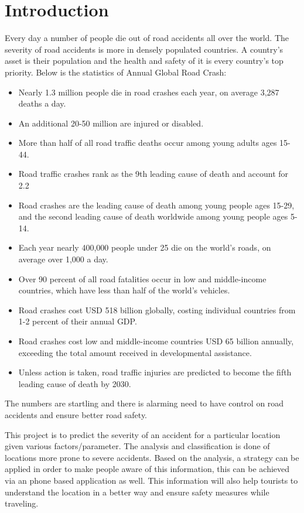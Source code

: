 \documentclass{acm_proc_article-sp}
\begin{document}
\section{Introduction}
Every day a number of people die out of road accidents all over the world. The severity of road accidents is more in densely populated countries. A country's asset is their population and the health and safety of it is every country's top priority. Below is the statistics of Annual Global Road Crash: \cite{statistics}
\begin{itemize}
    \item Nearly 1.3 million people die in road crashes each year, on average 3,287 deaths a day.
    \item An additional 20-50 million are injured or disabled.
    \item More than half of all road traffic deaths occur among young adults ages 15-44.
    \item Road traffic crashes rank as the 9th leading cause of death and account for 2.2%
    \item Road crashes are the leading cause of death among young people ages 15-29, and the second leading cause of death worldwide among young people ages 5-14.
    \item Each year nearly 400,000 people under 25 die on the world's roads, on average over 1,000 a day.
    \item Over 90 percent of all road fatalities occur in low and middle-income countries, which have less than half of the world's vehicles.
    \item Road crashes cost USD 518 billion globally, costing individual countries from 1-2 percent of their annual GDP.
    \item Road crashes cost low and middle-income countries USD 65 billion annually, exceeding the total amount received in developmental assistance.
    \item Unless action is taken, road traffic injuries are predicted to become the fifth leading cause of death by 2030.
\end{itemize}
The numbers are startling and there is alarming need to have control on road accidents and ensure better road safety.

This project is to predict the severity of an accident for a particular location given various factors/parameter. The analysis and classification is done of locations more prone to severe accidents. Based on the analysis, a strategy can be applied in order to make people aware of this information, this can be achieved via an phone based application as well. This information will also help tourists to understand the location in a better way and ensure safety measures while traveling. 
\end{document}

